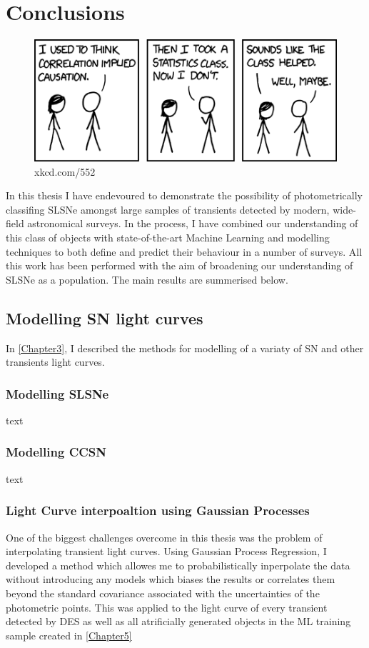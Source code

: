 \chapter{Conclusions}
\label{Chapter7}

\begin{figure}[H]
  \centering
  \includegraphics{Figures/xkcd/chapter7.png}
  \caption*{xkcd.com/552}
\end{figure}

In this thesis I have endevoured to demonstrate the possibility of photometrically classifing SLSNe amongst large samples of transients detected by modern, wide-field astronomical surveys. In the process, I have combined our understanding of this class of objects with state-of-the-art Machine Learning and modelling techniques to both define and predict their behaviour in a number of surveys. All this work has been performed with the aim of broadening our understanding of SLSNe as a population. The main results are summerised below.

\section{Modelling SN light curves}
In \cref{Chapter3}, I described the methods for modelling of a variaty of SN and other transients light curves.

\subsection{Modelling SLSNe}
text

\subsection{Modelling CCSN}
text

\subsection{Light Curve interpoaltion using Gaussian Processes}
One of the biggest challenges overcome in this thesis was the problem of interpolating transient light curves. Using Gaussian Process Regression, I developed a method which allowes me to probabilistically inperpolate the data without introducing any models which biases the results or correlates them beyond the standard covariance associated with the uncertainties of the photometric points. This was applied to the light curve of every transient detected by DES as well as all atrificially generated objects in the ML training sample created in \cref{Chapter5}

